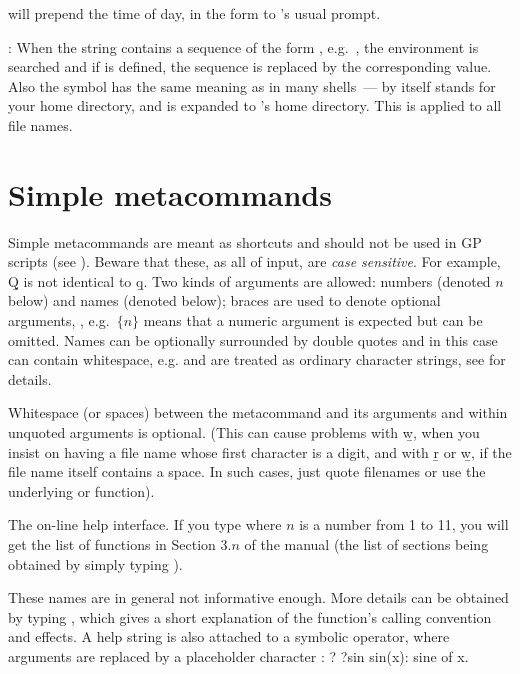 
\noindent
will prepend the time of day, in the form 
to 's usual prompt.

\item {}: When the string contains a sequence of
the form , e.g.~, the environment is
searched and if  is defined, the sequence is replaced by the
corresponding value. Also the \kbd{\til} symbol has the same meaning as in
many shells~--- \kbd{\til} by itself stands for your home directory, and
 is expanded to 's home directory. This is applied
to all file names. \label{se:envir}

\section{Simple metacommands}\label{se:meta}

\noindent
Simple metacommands are meant as shortcuts and should not be used in GP
scripts (see ). Beware that these, as all of 
input, are \emph{case sensitive}. For example, \b{Q} is not identical to
\b{q}. Two kinds of arguments are allowed: numbers (denoted $n$ below)
and names (denoted  below); braces are used to denote optional
arguments, , e.g.~$\{n\}$ means that a numeric argument is expected but
can be omitted. Names can be optionally surrounded by double quotes
and in this case can contain whitespace, e.g.  and are treated
as ordinary character strings, see  for details.

Whitespace (or spaces) between the metacommand and its arguments and within
unquoted arguments is optional. (This can cause problems with \b{w},
when you insist on having a file name whose first character is a digit, and
with \b{r} or \b{w}, if the file name itself contains a space. In such cases,
just quote filenames or use the underlying  or  function).

 The  on-line help interface.
If you type  where $n$ is a number from 1 to 11, you will get the
list of functions in Section $3.n$ of the manual (the list of sections being
obtained by simply typing ). \label{se:exthelp}

These names are in general not informative enough. More details can be
obtained by typing , which gives a short explanation of
the function's calling convention and effects. A help string is also attached
to a symbolic operator, where arguments are replaced by a placeholder
character \kbd{\_}:
\bprog
 ?  ?sin
 sin(x): sine of x.

